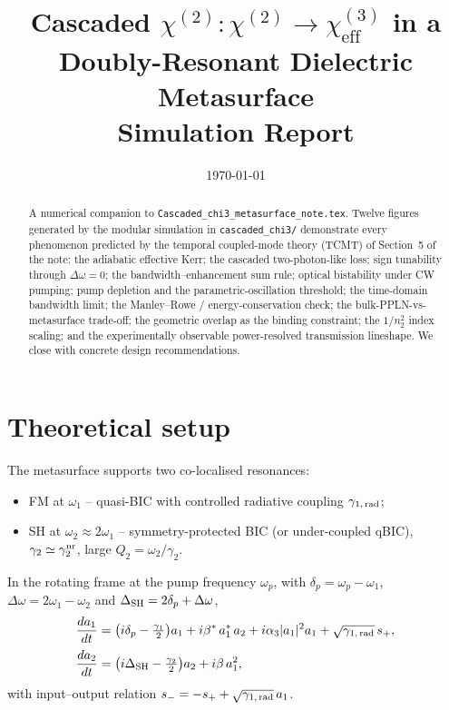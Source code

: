 \documentclass[11pt,a4paper]{article}
\newcommand{\chitwo}{\chi^{(2)}}
\newcommand{\chithree}{\chi^{(3)}}
\newcommand{\Dom}{\Delta\omega}
\newcommand{\DSH}{\Delta_{\rm SH}}
\newcommand{\grad}{\gamma_{1,\,\rm rad}}
\begin{document}
\title{Cascaded $\chitwo{:}\chitwo \to \chithree_\text{eff}$ in a Doubly-Resonant Dielectric Metasurface\\[2pt]
       \large Simulation Report}
\author{}
\date{\today}
\maketitle

\begin{abstract}
\noindent
A numerical companion to \texttt{Cascaded\_chi3\_metasurface\_note.tex}.
Twelve figures generated by the modular simulation in
\texttt{cascaded\_chi3/} demonstrate every phenomenon predicted by the
temporal coupled-mode theory (TCMT) of Section~5 of the note: the
adiabatic effective Kerr; the cascaded two-photon-like loss; sign
tunability through $\Dom = 0$; the bandwidth--enhancement sum rule;
optical bistability under CW pumping; pump depletion and the
parametric-oscillation threshold; the time-domain bandwidth limit; the
Manley--Rowe / energy-conservation check; the bulk-PPLN-vs-metasurface
trade-off; the geometric overlap as the binding constraint; the
$1/n_2^{2}$ index scaling; and the experimentally observable
power-resolved transmission lineshape. We close with concrete design
recommendations.
\end{abstract}

\tableofcontents
\bigskip

\section{Theoretical setup}
\label{sec:setup}

The metasurface supports two co-localised resonances:
\begin{itemize}[nosep]
  \item FM at $\omega_1$ -- quasi-BIC with controlled radiative
        coupling $\grad$;
  \item SH at $\omega_2 \approx 2\omega_1$ -- symmetry-protected
        BIC (or under-coupled qBIC), $\gamma_2 \simeq \gamma_2^{\rm nr}$,
        large $Q_2 = \omega_2/\gamma_2$.
\end{itemize}

In the rotating frame at the pump frequency $\omega_p$, with
$\delta_p = \omega_p - \omega_1$, $\Dom = 2\omega_1 - \omega_2$ and
$\DSH = 2\delta_p + \Dom$,
\begin{align}
  \frac{da_1}{dt}
        &= \bigl(i\delta_p - \tfrac{\gamma_1}{2}\bigr) a_1
        + i\beta^{*}\, a_1^{*}\, a_2
        + i\alpha_3 |a_1|^2 a_1
        + \sqrt{\grad}\, s_+,
        \label{eq:fm}\\[2pt]
  \frac{da_2}{dt}
        &= \bigl(i\DSH - \tfrac{\gamma_2}{2}\bigr) a_2
        + i\beta\, a_1^{2},
        \label{eq:sh}
\end{align}
with input--output relation $s_- = -s_+ + \sqrt{\grad}\, a_1$.
\end{document}
